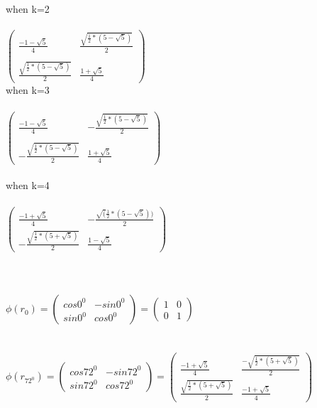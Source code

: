\documentclass{article}
\begin{document}
when k=2\\\\
$\begin{pmatrix}
\frac{-1-\sqrt{5}}{4} & \frac{\sqrt{\frac{1}{2}*(5-\sqrt{5})}}{2}\\\\
\frac{\sqrt{\frac{1}{2}*(5-\sqrt{5})}}{2}& \frac{1+\sqrt{5}}{4}
\end{pmatrix}$ \\

when k=3\\\\
$\begin{pmatrix}
\frac{-1-\sqrt{5}}{4} & -\frac{\sqrt{\frac{1}{2}*(5-\sqrt{5})}}{2}\\\\
-\frac{\sqrt{\frac{1}{2}*(5-\sqrt{5})}}{2}& \frac{1+\sqrt{5}}{4}
\end{pmatrix}$ \\\\

when k=4\\\\
$\begin{pmatrix}
\frac{-1+\sqrt{5}}{4} & -\frac{\sqrt(\frac{1}{2}*(5-\sqrt{5}))}{2}\\
-\frac{\sqrt{\frac{1}{2}*(5+\sqrt{5})}}{2}& \frac{1-\sqrt{5}}{4}
\end{pmatrix}$ 
\\\\\\


\\
$\phi (r_0) = 
\begin{pmatrix}
cos 0^0 & -sin 0^0\\
sin 0^0 & cos0^0
\end{pmatrix} =
\begin{pmatrix}
1 & 0\\
0 & 1
\end{pmatrix} $\\\\

\\
$\phi (r_{72^0}) = 
\begin{pmatrix}
cos 72^0 & -sin 72^0\\
sin 72^0 & cos72^0
\end{pmatrix} =
\begin{pmatrix}
\frac{-1+\sqrt{5}}{4} & \frac{-\sqrt{\frac{1}{2}*(5+\sqrt{5})}}{2}\\
\frac{\sqrt{\frac{1}{2}*(5+\sqrt{5})}}{2}& \frac{-1+\sqrt{5}}{4}
\end{pmatrix} $\\\\
\end{document}
